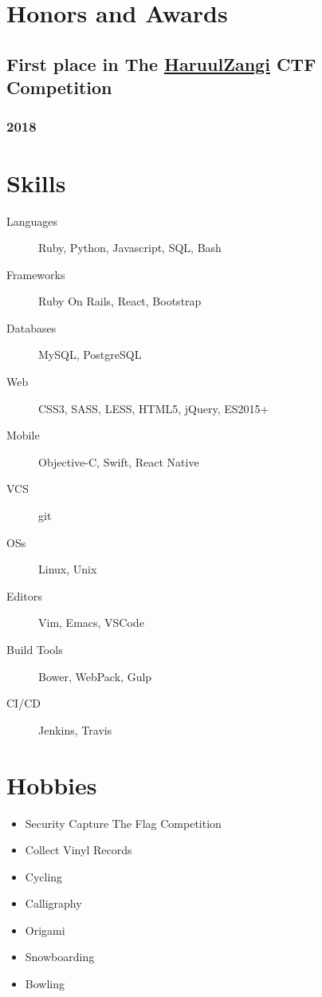 \documentclass[letterpaper]{article}
\begin{document}
\section{Honors and Awards}
\label{sec:orged223a4}
\subsection{First place in The \href{http:www.haruulzangi.mn}{HaruulZangi} CTF Competition}
\label{sec:org73b59ac}
\subsubsection{2018}
\label{sec:org999de34}
\section{Skills}
\label{sec:org2f211cf}
\begin{description}
\item[{Languages}] Ruby, Python, Javascript, SQL, Bash
\item[{Frameworks}] Ruby On Rails, React, Bootstrap
\item[{Databases}] MySQL, PostgreSQL
\item[{Web}] CSS3, SASS, LESS, HTML5, jQuery, ES2015+
\item[{Mobile}] Objective-C, Swift, React Native
\item[{VCS}] git
\item[{OSs}] Linux, Unix
\item[{Editors}] Vim, Emacs, VSCode
\item[{Build Tools}] Bower, WebPack, Gulp
\item[{CI/CD}] Jenkins, Travis
\end{description}
\section{Hobbies}
\label{sec:org648b872}
\begin{itemize}
\item Security Capture The Flag Competition
\item Collect Vinyl Records
\item Cycling
\item Calligraphy
\item Origami
\item Snowboarding
\item Bowling
\end{itemize}
\end{document}
